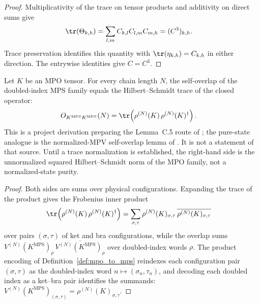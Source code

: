 \begin{proof}
    \leanok
    Multiplicativity of the trace on tensor products and additivity on direct
    sums give
    \begin{align}
        \tr(\Theta_{k,h})
         & =\sum_{l,m}C_{k,l}C_{l,m}C_{m,h}
        =(C^3)_{k,h}.
        \notag
    \end{align}
    Trace preservation identifies this quantity with
    $\tr(\eta_{k,h})=C_{k,h}$ in either direction.  The entrywise identities
    give $C=C^3$.
\end{proof}

\begin{lemma}
    \label{thm:mpdo_doubled_overlap_hilbert_schmidt}
    \leanok
    Let $K$ be an MPO tensor. For every chain length $N$, the
    self-overlap of the doubled-index MPS family equals the
    Hilbert--Schmidt trace of the closed operator:
    \begin{align}
        O_{K^{\mathrm{MPS}}K^{\mathrm{MPS}}}(N)
         & =\tr\!\left(\rho^{(N)}(K)\,\rho^{(N)}(K)^\dagger\right).
        \notag
    \end{align}
    This is a project derivation preparing the Lemma~C.5 route of
    \cite[Appendix~C.2, lines~1473--1499]{Cirac2016MPDO_arXiv}; the
    pure-state analogue is the normalized-MPV self-overlap lemma of
    \cite[lines~1080--1100]{Cirac2016MPDO_arXiv}. It is not a statement
    of that source. Until a trace normalization is established, the
    right-hand side is the unnormalized squared Hilbert--Schmidt norm of the MPO
    family, not a normalized-state purity.
\end{lemma}

\begin{proof}
    \leanok
    Both sides are sums over physical configurations. Expanding the
    trace of the product gives the Frobenius inner product
    \begin{align}
        \tr\!\left(\rho^{(N)}(K)\,\rho^{(N)}(K)^\dagger\right)
         & =\sum_{\sigma,\tau}
        \rho^{(N)}(K)_{\sigma,\tau}\,
        \overline{\rho^{(N)}(K)_{\sigma,\tau}}
        \notag
    \end{align}
    over pairs $(\sigma,\tau)$ of ket and bra configurations, while the
    overlap sums
    $V^{(N)}(K^{\mathrm{MPS}})_\rho\,
        \overline{V^{(N)}(K^{\mathrm{MPS}})_\rho}$ over doubled-index words
    $\rho$. The product encoding of Definition~\ref{def:mpo_to_mps}
    reindexes each configuration pair $(\sigma,\tau)$ as the
    doubled-index word $n\mapsto(\sigma_n,\tau_n)$, and decoding each
    doubled index as a ket--bra pair identifies the summands:
    $V^{(N)}(K^{\mathrm{MPS}})_{(\sigma,\tau)}
        =\rho^{(N)}(K)_{\sigma,\tau}$.
\end{proof}

